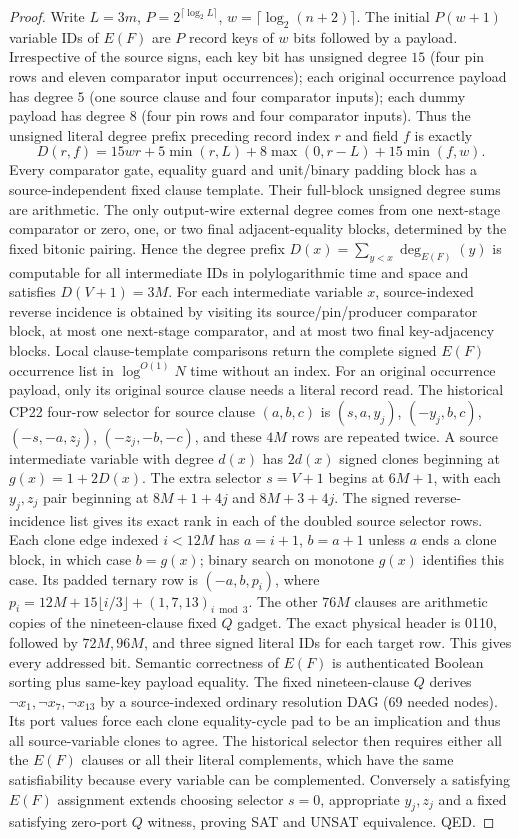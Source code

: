 \documentclass[11pt]{article}
\begin{document}
\begin{proof}
Write $L=3m$, $P=2^{\lceil\log_2 L\rceil}$, $w=\lceil\log_2(n+2)\rceil$. The initial $P(w+1)$ variable IDs of $E(F)$ are $P$ record keys of $w$ bits followed by a payload. Irrespective of the source signs, each key bit has unsigned degree $15$ (four pin rows and eleven comparator input occurrences); each original occurrence payload has degree $5$ (one source clause and four comparator inputs); each dummy payload has degree $8$ (four pin rows and four comparator inputs). Thus the unsigned literal degree prefix preceding record index $r$ and field $f$ is exactly
\[
 D(r,f)=15wr+5\min(r,L)+8\max(0,r-L)+15\min(f,w).
\]
Every comparator gate, equality guard and unit/binary padding block has a source-independent fixed clause template. Their full-block unsigned degree sums are arithmetic. The only output-wire external degree comes from one next-stage comparator or zero, one, or two final adjacent-equality blocks, determined by the fixed bitonic pairing. Hence the degree prefix $D(x)=\sum_{y<x}\deg_{E(F)}(y)$ is computable for all intermediate IDs in polylogarithmic time and space and satisfies $D(V+1)=3M$.
For each intermediate variable $x$, source-indexed reverse incidence is obtained by visiting its source/pin/producer comparator block, at most one next-stage comparator, and at most two final key-adjacency blocks. Local clause-template comparisons return the complete signed $E(F)$ occurrence list in $\log^{O(1)}N$ time without an index. For an original occurrence payload, only its original source clause needs a literal record read.
The historical CP22 four-row selector for source clause $(a,b,c)$ is $(s,a,y_j)$, $(-y_j,b,c)$, $(-s,-a,z_j)$, $(-z_j,-b,-c)$, and these $4M$ rows are repeated twice. A source intermediate variable with degree $d(x)$ has $2d(x)$ signed clones beginning at $g(x)=1+2D(x)$. The extra selector $s=V+1$ begins at $6M+1$, with each $y_j,z_j$ pair beginning at $8M+1+4j$ and $8M+3+4j$. The signed reverse-incidence list gives its exact rank in each of the doubled source selector rows. Each clone edge indexed $i<12M$ has $a=i+1$, $b=a+1$ unless $a$ ends a clone block, in which case $b=g(x)$; binary search on monotone $g(x)$ identifies this case. Its padded ternary row is $(-a,b,p_i)$, where $p_i=12M+15\lfloor i/3\rfloor+(1,7,13)_{i\bmod3}$. The other $76M$ clauses are arithmetic copies of the nineteen-clause fixed $Q$ gadget. The exact physical header is 0110, followed by $72M,96M$, and three signed literal IDs for each target row. This gives every addressed bit.
Semantic correctness of $E(F)$ is authenticated Boolean sorting plus same-key payload equality. The fixed nineteen-clause $Q$ derives $\neg x_1,\neg x_7,\neg x_{13}$ by a source-indexed ordinary resolution DAG (69 needed nodes). Its port values force each clone equality-cycle pad to be an implication and thus all source-variable clones to agree. The historical selector then requires either all the $E(F)$ clauses or all their literal complements, which have the same satisfiability because every variable can be complemented. Conversely a satisfying $E(F)$ assignment extends choosing selector $s=0$, appropriate $y_j,z_j$ and a fixed satisfying zero-port $Q$ witness, proving SAT and UNSAT equivalence. QED.
\end{proof}
\end{document}
